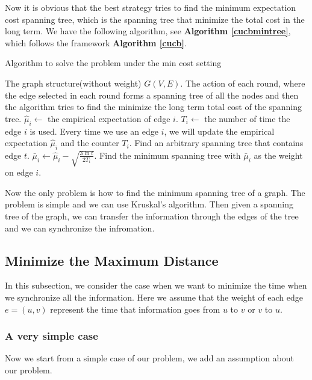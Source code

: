 \documentclass{article}
\theoremstyle{plain}
\theoremstyle{definition}
\theoremstyle{remark}
\begin{document}
    Now it is obvious that the best strategy tries to find the minimum expectation cost spanning tree, which is the spanning tree that minimize the total cost in the long term. We have the following algorithm, see \textbf{Algorithm \ref{cucbmintree}}, which follows the framework \textbf{Algorithm \ref{cucb}}.

    \begin{algorithm}
        \caption{Algorithm to solve the problem under the min cost setting}
        \label{cucbmintree}
        \begin{algorithmic}[1]
        \Require The graph structure(without weight) $G(V,E)$.
        \Ensure The action of each round, where the edge selected in each round forms a spanning tree of all the nodes and then the algorithm tries to find the minimize the long term total cost of the spanning tree.
            \State $\hat \mu_i \leftarrow$ the empirical expectation of edge $i$.
            \State $T_i \leftarrow$ the number of time the edge $i$ is used.
            \State Every time we use an edge $i$, we will update the empirical expectation $\hat \mu_i$ and the counter $T_i$.
                \State Find an arbitrary spanning tree that contains edge $t$.
            \EndFor
                \State $\bar\mu_i \leftarrow \hat\mu_i - \sqrt{\frac{3\ln t}{2T_i}}$.
                \State Find the minimum spanning tree with $\bar\mu_i$ as the weight on edge $i$.
            \EndFor
        \EndProcedure
        \end{algorithmic}
    \end{algorithm}

    Now the only problem is how to find the minimum spanning tree of a graph. The problem is simple and we can use Kruskal's algorithm. Then given a spanning tree of the graph, we can transfer the information through the edges of the tree and we can synchronize the infromation.

    \subsection{Minimize the Maximum Distance}
    In this subsection, we consider the case when we want to minimize the time when we synchronize all the information. Here we assume that the weight of each edge $e = (u,v)$ represent the time that information goes from $u$ to $v$ or $v$ to $u$.

    \subsubsection{A very simple case}
    Now we start from a simple case of our problem, we add an assumption about our problem.\\
    
\end{document}
